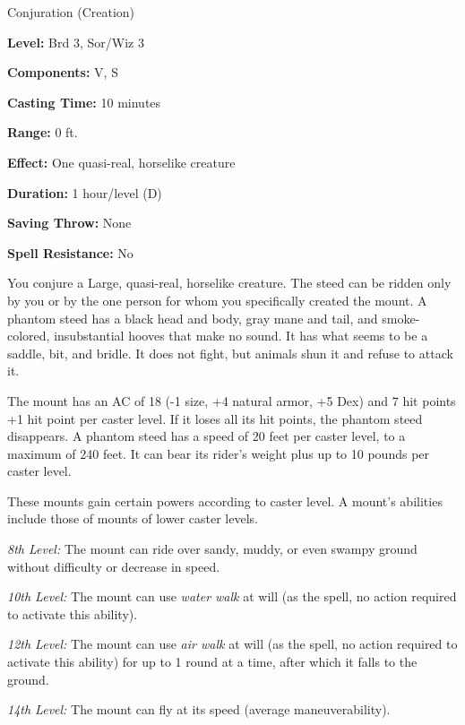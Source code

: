 
Conjuration (Creation)

\textbf{Level:} Brd 3, Sor/Wiz 3

\textbf{Components:} V, S

\textbf{Casting Time:} 10 minutes

\textbf{Range:} 0 ft.

\textbf{Effect:} One quasi-real, horselike creature

\textbf{Duration:} 1 hour/level (D)

\textbf{Saving Throw:} None

\textbf{Spell Resistance:} No

You conjure a Large, quasi-real, horselike creature. The steed can be ridden only 
by you or by the one person for whom you specifically created the mount. A phantom 
steed has a black head and body, gray mane and tail, and smoke-colored, insubstantial 
hooves that make no sound. It has what seems to be a saddle, bit, and bridle. It 
does not fight, but animals shun it and refuse to attack it.

The mount has an AC of 18 (-1 size, +4 natural armor, +5 Dex) and 7 hit points 
+1 hit point per caster level. If it loses all its hit points, the phantom steed 
disappears. A phantom steed has a speed of 20 feet per caster level, to a maximum 
of 240 feet. It can bear its rider's weight plus up to 10 pounds per caster level.

These mounts gain certain powers according to caster level. A mount's abilities 
include those of mounts of lower caster levels. 

\textit{8th Level:} The mount can ride over sandy, muddy, or even swampy ground 
without difficulty or decrease in speed.

\textit{10th Level:} The mount can use \textit{water walk} at will (as the spell, 
no action required to activate this ability).

\textit{12th Level:} The mount can use \textit{air walk} at will (as the spell, 
no action required to activate this ability) for up to 1 round at a time, after 
which it falls to the ground.

\textit{14th Level:} The mount can fly at its speed (average maneuverability).

